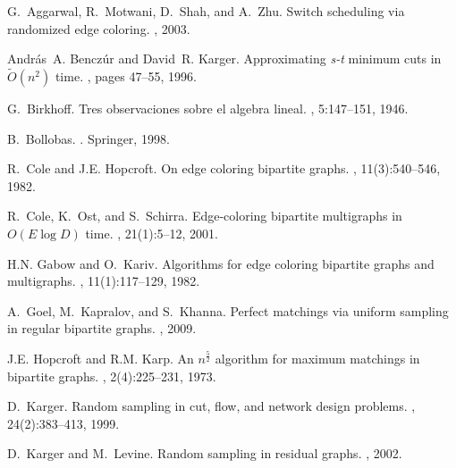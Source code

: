 \documentclass[11pt]{article}
\begin{document}
\begin{thebibliography}{10}

G.~Aggarwal, R.~Motwani, D.~Shah, and A.~Zhu.
\newblock Switch scheduling via randomized edge coloring.
, 2003.

Andr{\'a}s~A. Bencz{\'u}r and David~R. Karger.
\newblock Approximating {\it s-t} minimum cuts in $\tilde{O}(n^2)$ time.
, pages 47--55, 1996.

G.~Birkhoff.
\newblock Tres observaciones sobre el algebra lineal.
, 5:147--151, 1946.

B.~Bollobas.
.
\newblock Springer, 1998.

R.~Cole and J.E. Hopcroft.
\newblock On edge coloring bipartite graphs.
, 11(3):540--546, 1982.

R.~Cole, K.~Ost, and S.~Schirra.
\newblock Edge-coloring bipartite multigraphs in {$O(E \log D)$} time.
, 21(1):5--12, 2001.

H.N. Gabow and O.~Kariv.
\newblock Algorithms for edge coloring bipartite graphs and multigraphs.
, 11(1):117--129, 1982.

A.~Goel, M.~Kapralov, and S.~Khanna.
\newblock Perfect matchings via uniform sampling in regular bipartite graphs.
, 2009.

J.E. Hopcroft and R.M. Karp.
\newblock An $n^{\frac{5}{2}}$ algorithm for maximum matchings in bipartite
  graphs.
, 2(4):225--231, 1973.

D.~Karger.
\newblock Random sampling in cut, flow, and network design problems.
,
  24(2):383--413, 1999.

D.~Karger and M.~Levine.
\newblock Random sampling in residual graphs.
, 2002.


\end{thebibliography}
\end{document}
